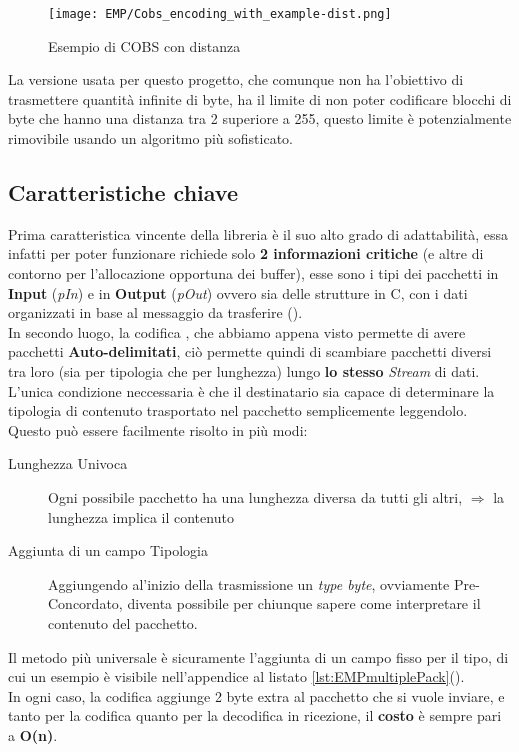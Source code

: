 \begin{figure}[h]
	\centering
	\texttt{[image: EMP/Cobs\_encoding\_with\_example-dist.png]}
	\caption[Esempio di COBS con distanza]{Esempio di COBS con distanza}
\end{figure}

La versione usata per questo progetto, che comunque non ha l'obiettivo di trasmettere quantità infinite di byte, ha il limite di non poter codificare blocchi di byte che hanno una distanza tra 2 \zeroByte superiore a 255, questo limite è potenzialmente rimovibile usando un algoritmo più sofisticato.

\subsection{Caratteristiche chiave}
Prima caratteristica vincente della libreria è il suo alto grado di adattabilità, essa infatti per poter funzionare richiede solo \textbf{2 informazioni critiche} (e altre di contorno per l'allocazione opportuna dei buffer), esse sono i tipi dei pacchetti in \textbf{ Input} (\textit{pIn}) e in \textbf{Output} (\textit{pOut}) ovvero sia delle strutture in C, con i dati organizzati in base al messaggio da trasferire ().\\
In secondo luogo, la codifica , che abbiamo appena visto permette di avere pacchetti \textbf{Auto-delimitati}, ciò permette quindi di scambiare pacchetti diversi tra loro (sia per tipologia che per lunghezza) lungo \textbf{lo stesso} \textit{Stream} di dati.\\
L'unica condizione neccessaria è che il destinatario sia capace di determinare la tipologia di contenuto trasportato nel pacchetto semplicemente leggendolo.\\
Questo può essere facilmente risolto in più modi:
\begin{spacing}{1.5}
	\begin{description}
		\item[Lunghezza Univoca] Ogni possibile pacchetto ha una lunghezza diversa da tutti gli altri, $\Rightarrow$ la lunghezza implica il contenuto
		\item[Aggiunta di un campo Tipologia] Aggiungendo al’inizio della trasmissione un \textit{type byte}, ovviamente Pre-Concordato, diventa possibile per chiunque sapere come interpretare il contenuto del pacchetto.
	\end{description}
\end{spacing}
\noindent
Il metodo più universale è sicuramente l'aggiunta di un campo fisso per il tipo, di cui un esempio è visibile nell'appendice al listato \ref{lst:EMPmultiplePack}().\\
In ogni caso, la codifica \cite*{COBS} aggiunge 2 byte extra al pacchetto che si vuole inviare, e tanto per la codifica quanto per la decodifica in ricezione, il \textbf{costo} è sempre pari a \textbf{O(n)}.

